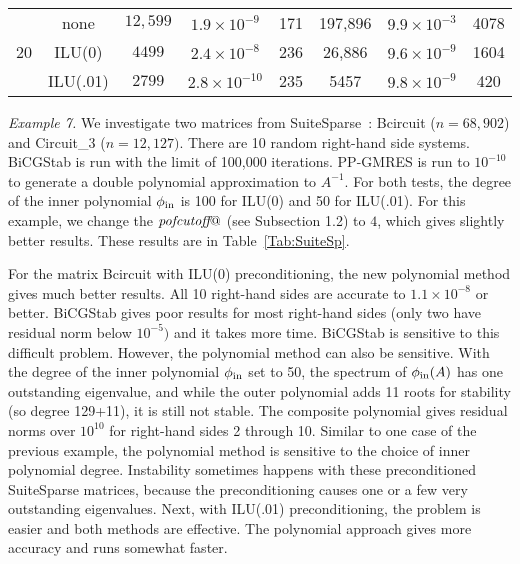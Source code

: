 \documentclass{siamart}
\makeatletter
\def\pofcutoff{\mbox{{\it pofcutoff}}@}
\makeatother
\begin{document}
\begin{table}
\begin{center}
\begin{tabular}{|c|c|c|c|c||c|c|c|}
 & none       & $12{,}599$  & $1.9\times10^{-9}$    & 171            & 197{,}896      & $9.9\times10^{-3}$     & 4078       \\ \cline{2-8}
20 & ILU(0)     & $4499$     & $2.4\times10^{-8}$    & 236            & 26{,}886      & $9.6\times10^{-9}$     & 1604       \\ \cline{2-8}
 & ILU(.01)   & $2799$  & $2.8\times10^{-10}$    & 235            & 5457     & $9.8\times10^{-9}$     & 420       \\ \hline \hline
        
\end{tabular}
\end{center}
\label{Tab:CDindef}
\end{table}

{\it Example 7.}  
We investigate two matrices from SuiteSparse~\cite{SuiteSparse}: Bcircuit ($n=68{,}902$) and Circuit\_3 ($n=12{,}127)$.  There are 10 random right-hand side systems.  BiCGStab is run with the limit of 100{,}000 iterations.    PP-GMRES is run to $10^{-10}$ to generate a double polynomial approximation to $A^{-1}$. For both tests, the degree of the inner polynomial $\phi_{\rm in}$ is 100 for ILU(0) and 50 for ILU(.01).  For this example, we change the $\pofcutoff$ (see Subsection 1.2) to $4$, which gives slightly better results.  These results are in Table~\ref{Tab:SuiteSp}.

For the matrix Bcircuit with ILU(0) preconditioning, the new polynomial method gives much better results.  All 10 right-hand sides are accurate to $1.1 \times 10^{-8}$ or better.  BiCGStab gives poor results for most right-hand sides (only two have residual norm below $10^{-5})$ and it takes more time.  BiCGStab is sensitive to this difficult problem.  However, the polynomial method can also be sensitive.  With the degree of the inner polynomial $\phi_{\rm in}$ set to 50, the spectrum of $\phi_{\rm in}(A)$ has one outstanding eigenvalue, and while the outer polynomial adds 11 roots for stability (so degree 129+11), it is still not stable.  The composite polynomial gives residual norms over $10^{10}$ for right-hand sides 2 through 10.  Similar to one case of the previous example, the polynomial method is sensitive to the choice of inner polynomial degree.  Instability sometimes happens with these preconditioned SuiteSparse matrices, because the preconditioning causes one or a few very outstanding eigenvalues.  Next, with ILU(.01) preconditioning, the problem is easier and both methods are effective.  The polynomial approach gives more accuracy and runs somewhat faster.  
\end{document}
